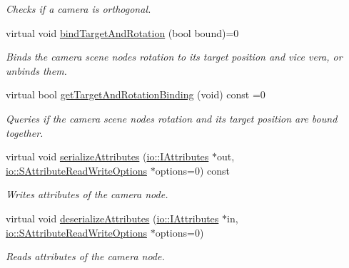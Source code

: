 \begin{DoxyCompactItemize}
\begin{DoxyCompactList}\small\item\em Checks if a camera is orthogonal. \end{DoxyCompactList}\item 
virtual void \hyperlink{classirr_1_1scene_1_1ICameraSceneNode_ad8785d7b2f730933a8d4425ac54e7205}{bind\+Target\+And\+Rotation} (bool bound)=0
\begin{DoxyCompactList}\small\item\em Binds the camera scene node\textquotesingle{}s rotation to its target position and vice vera, or unbinds them. \end{DoxyCompactList}\item 
virtual bool \hyperlink{classirr_1_1scene_1_1ICameraSceneNode_a343be24b2c43db7580127229db2dec6a}{get\+Target\+And\+Rotation\+Binding} (void) const =0
\begin{DoxyCompactList}\small\item\em Queries if the camera scene node\textquotesingle{}s rotation and its target position are bound together. \end{DoxyCompactList}\item 
\mbox{\label{classirr_1_1scene_1_1ICameraSceneNode_a0a78a29638be1665ee5dba22c2c3b846}} 
virtual void \hyperlink{classirr_1_1scene_1_1ICameraSceneNode_a0a78a29638be1665ee5dba22c2c3b846}{serialize\+Attributes} (\hyperlink{classirr_1_1io_1_1IAttributes}{io\+::\+I\+Attributes} $\ast$out, \hyperlink{structirr_1_1io_1_1SAttributeReadWriteOptions}{io\+::\+S\+Attribute\+Read\+Write\+Options} $\ast$options=0) const
\begin{DoxyCompactList}\small\item\em Writes attributes of the camera node. \end{DoxyCompactList}\item 
\mbox{\label{classirr_1_1scene_1_1ICameraSceneNode_a0df881cb5e2a55562399281061151ae8}} 
virtual void \hyperlink{classirr_1_1scene_1_1ICameraSceneNode_a0df881cb5e2a55562399281061151ae8}{deserialize\+Attributes} (\hyperlink{classirr_1_1io_1_1IAttributes}{io\+::\+I\+Attributes} $\ast$in, \hyperlink{structirr_1_1io_1_1SAttributeReadWriteOptions}{io\+::\+S\+Attribute\+Read\+Write\+Options} $\ast$options=0)
\begin{DoxyCompactList}\small\item\em Reads attributes of the camera node. \end{DoxyCompactList}\end{DoxyCompactItemize}
